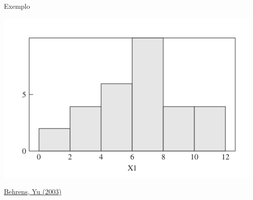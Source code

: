 \documentclass{beamer}
\begin{document}
\begin{frame}
  \begin{exampleblock}{Exemplo}
    \begin{center}
      \includegraphics[height=0.7\textheight]{EDA/eda-histograma1}
    \end{center}
  \end{exampleblock}

  \vfill
  \scriptsize
  \hfill \href{https://doi.org/10.1002/0471264385.wei0202}
  {Behrens, Yu (2003)}
\end{frame}
\end{document}
